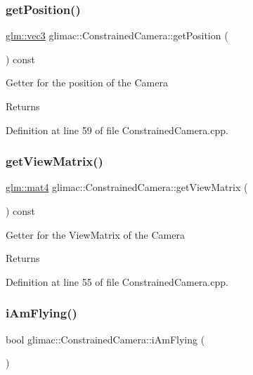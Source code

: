 \subsubsection{\texorpdfstring{get\+Position()}{getPosition()}}
{\footnotesize\ttfamily \hyperlink{group__core__types_ga1c47e8b3386109bc992b6c48e91b0be7}{glm\+::vec3} glimac\+::\+Constrained\+Camera\+::get\+Position (\begin{DoxyParamCaption}{ }\end{DoxyParamCaption}) const}

Getter for the position of the Camera \begin{DoxyReturn}{Returns}

\end{DoxyReturn}


Definition at line 59 of file Constrained\+Camera.\+cpp.

\mbox{\label{classglimac_1_1_constrained_camera_aedb07f0ce070319d50e4600b350d4c20}} 
\subsubsection{\texorpdfstring{get\+View\+Matrix()}{getViewMatrix()}}
{\footnotesize\ttfamily \hyperlink{group__core__types_ga7dcd2365c2e368e6af5b7adeb6a9c8df}{glm\+::mat4} glimac\+::\+Constrained\+Camera\+::get\+View\+Matrix (\begin{DoxyParamCaption}{ }\end{DoxyParamCaption}) const}

Getter for the View\+Matrix of the Camera \begin{DoxyReturn}{Returns}

\end{DoxyReturn}


Definition at line 55 of file Constrained\+Camera.\+cpp.

\mbox{\label{classglimac_1_1_constrained_camera_a77a986ffa98ff09f3fcafc6c7d235e99}} 
\subsubsection{\texorpdfstring{i\+Am\+Flying()}{iAmFlying()}}
{\footnotesize\ttfamily bool glimac\+::\+Constrained\+Camera\+::i\+Am\+Flying (\begin{DoxyParamCaption}{ }\end{DoxyParamCaption})\hspace{0.3cm}{\ttfamily [inline]}}

